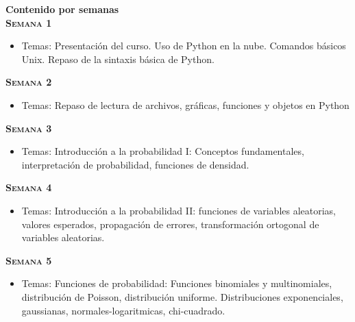 \documentclass[letterpaper,10pt,onecolumn]{article}
\begin{document}
\newpage
{}
\noindent\textbf{\large {} \quad Contenido por
  semanas}\\[-0.2cm]  


\noindent\textbf{\textsc{Semana 1}}\\[-0.5cm]
\begin{itemize}
\item Temas: 
Presentaci\'on del curso. Uso de Python en la nube. Comandos b\'asicos Unix. 
Repaso de la sintaxis b\'asica de Python. \\[-0.6cm] 
\end{itemize}


\noindent\textbf{\textsc{Semana 2}} \\[-0.5cm]
\begin{itemize}
\item Temas: 
Repaso de lectura de archivos, gr\'aficas, funciones y objetos en Python \\[-0.6cm] 
\end{itemize}

\noindent\textbf{\textsc{Semana 3}}\\[-0.5cm]
\begin{itemize}
\item Temas:  Introducci\'on a la probabilidad I: Conceptos fundamentales, interpretaci\'on de probabilidad, funciones de densidad. \\[-0.6cm]
\end{itemize}

\noindent\textbf{\textsc{Semana 4}}\\[-0.5cm]
\begin{itemize}
\item Temas:  Introducci\'on a la probabilidad II: funciones de variables aleatorias, valores esperados, propagaci\'on de errores, transformaci\'on ortogonal de variables aleatorias. \\[-0.6cm]
\end{itemize}

\noindent\textbf{\textsc{Semana 5}}\\[-0.5cm]
\begin{itemize}
\item Temas: Funciones de probabilidad: Funciones binomiales y multinomiales, distribuci\'on de Poisson, distribuci\'on uniforme. Distribuciones exponenciales, gaussianas, normales-logaritmicas, chi-cuadrado. \\[-0.6cm]
\end{itemize}
\end{document}
